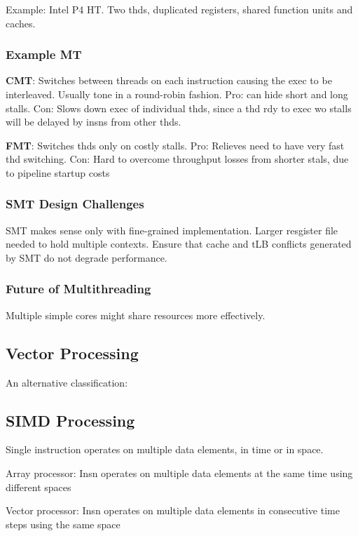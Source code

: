 \documentclass[a4paper, fontsize=8pt, landscape, DIV=1]{scrartcl}
\makeatletter
\renewenvironment{outline}[1][]{%
  \ifthenelse{\equal{#1}{}}{}{\renewcommand{\ol@type}{#1}}%
  \ol@z%
  \newcommand{\0}{\ol@toz\ol@z}%
  \newcommand{\1}{\vspace{\dimexpr\outlinespacingscalar\baselineskip-\baselineskip}\ol@toi\ol@i\item}%
  \newcommand{\2}{\vspace{\dimexpr\outlinespacingscalartwo\baselineskip-\baselineskip}\ol@toii\ol@ii\item}%
  \newcommand{\3}{\vspace{\dimexpr\outlinespacingscalar\baselineskip-\baselineskip}\ol@toiii\ol@iii\item}%
  \newcommand{\4}{\vspace{\dimexpr\outlinespacingscalar\baselineskip-\baselineskip}\ol@toiiii\ol@iiii\item}%
}{%
  \ol@toz\ol@exit%
}
\def\outlinespacingscalar{0.5}
\def\outlinespacingscalartwo{0.5}
\makeatother
\begin{document}
\begin{multicols*}{4}
  Example: Intel P4 HT. Two thds, duplicated registers, shared function units and
  caches.

  \subsubsection{Example MT}
  \textbf{CMT}: Switches between threads on each instruction causing the exec to be interleaved.
  Usually tone in a round-robin fashion. Pro: can hide short and long stalls. Con: Slows
  down exec of individual thds, since a thd rdy to exec wo stalls will be delayed by insns 
  from other thds.

  \textbf{FMT}: Switches thds only on costly stalls. Pro: Relieves need to have very fast 
  thd switching. Con: Hard to overcome throughput losses from shorter stals, due to pipeline
  startup costs


  \subsubsection{SMT Design Challenges}
  SMT makes sense only with fine-grained implementation. Larger resgister file
  needed to hold multiple contexts. Ensure that cache and tLB conflicts generated
  by SMT do not degrade performance.

  \subsubsection{Future of Multithreading}
  Multiple simple cores might share resources more effectively.

  \subsection{Vector Processing}
  An alternative classification:

  \subsection{SIMD Processing}
  Single instruction operates on multiple data elements, in time or in space. 
  \begin{outline}
    \1 Array processor: Insn operates on multiple data elements at the same time using
    different spaces
    \1 Vector processor: Insn operates on multiple data elements in consecutive time steps
    using the same space
  \end{outline}


\end{multicols*}
\end{document}
